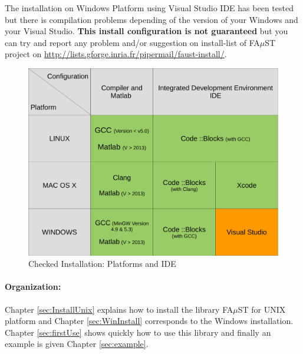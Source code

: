 The installation on Windows Platform using Visual Studio IDE has been tested but there is compilation problems depending of the version of your Windows and your Visual Studio. \textbf{This install configuration is not guaranteed} but you can try and report any problem and/or suggestion on install-list of FA$\mu$ST project on \url{http://lists.gforge.inria.fr/pipermail/faust-install/}. 

\begin{figure}[H] %
\centering
\includegraphics[scale=0.4]{images/recapInstall.pdf}
\caption{Checked Installation: Platforms and IDE}
\label{fig:recapInstall}
\end{figure}


\paragraph{Organization:}Chapter \ref{sec:InstallUnix} explains how to install the library FA$\mu$ST for UNIX platform and Chapter \ref{sec:WinInstall} corresponds to the Windows installation. Chapter \ref{sec:firstUse} shows quickly how to use this library and finally an example is given Chapter \ref{sec:example}. 
